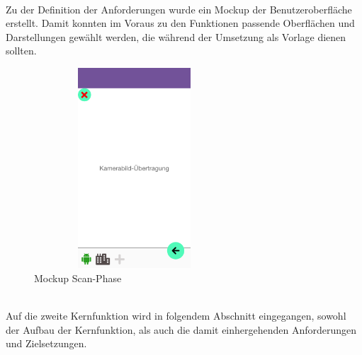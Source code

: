 \\ 
\linebreak
Zu der Definition der Anforderungen wurde ein Mockup der Benutzeroberfläche erstellt. Damit konnten im Voraus zu den Funktionen passende Oberflächen und 
Darstellungen gewählt werden, die während der Umsetzung als Vorlage dienen sollten. 
\\
\linebreak
\begin{figure}[hbt!]
    \centering
    \includegraphics[width=7.5cm,height=7.5cm,keepaspectratio]{3Konzeption/Bilder/Scan-Phase_AugmIS.png}
    \caption{Mockup Scan-Phase}
    \label{pic:Mockscan}
\end{figure}
\\
Auf die zweite Kernfunktion wird in folgendem Abschnitt eingegangen, sowohl der Aufbau der Kernfunktion, als auch die damit einhergehenden 
Anforderungen und Zielsetzungen.


